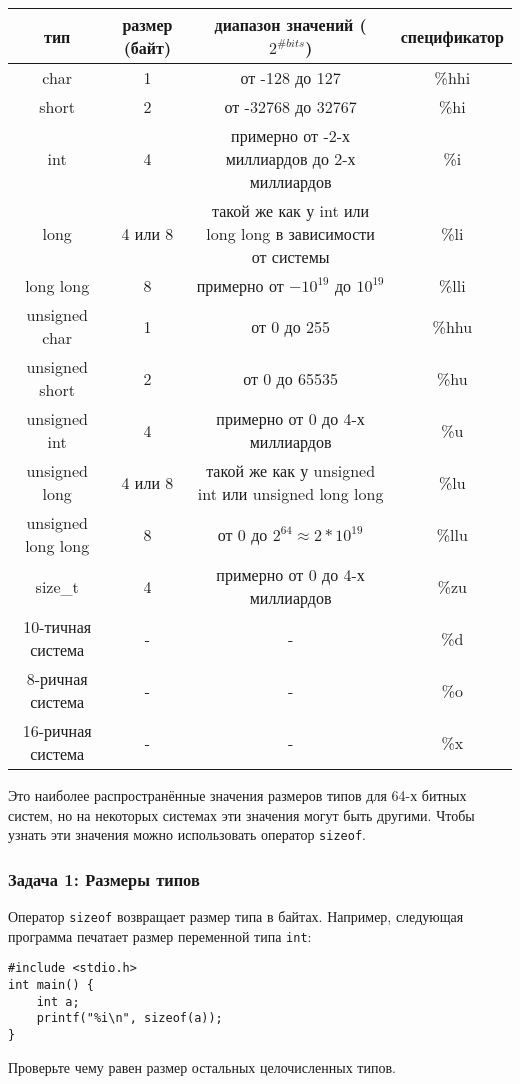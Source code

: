 \documentclass{article}
\begin{document}
\begin{center}
\begin{tabular}{ c c c c }
 тип & размер (байт) & диапазон значений ($2^{\# bits}$) & спецификатор \\ \hline
 char & 1 & от -128 до 127 & \%hhi \\ 
 short & 2 & от -32768 до 32767 & \%hi  \\  
 int & 4 & примерно от -2-х миллиардов до 2-х миллиардов & \%i  \\  
 long & 4 или 8 & такой же как у int или long long в зависимости от системы & \%li  \\  
 long long & 8 & примерно от $-10^{19}$ до $10^{19}$ & \%lli  \\  
 unsigned char & 1 & от 0 до 255 & \%hhu \\ 
 unsigned short & 2 & от 0 до 65535 & \%hu  \\  
 unsigned int & 4 & примерно от 0 до 4-х миллиардов & \%u  \\  
 unsigned long & 4 или 8 & такой же как у unsigned int или unsigned long long & \%lu  \\  
 unsigned long long & 8 & от 0 до $2^{64} \approx 2*10^{19}$  & \%llu  \\  
 size\_t & 4 & примерно от 0 до 4-х миллиардов & \%zu \\ \hline
 10-тичная система & - & - & \%d \\
 8-ричная система & - & - & \%o \\
 16-ричная система & - & - & \%x  \\ 
\end{tabular}
\end{center}
Это наиболее распространённые значения размеров типов для 64-х битных систем, но на некоторых системах эти значения могут быть другими.
Чтобы узнать эти значения можно использовать оператор \texttt{sizeof}. \\

\subsubsection*{Задача 1: Размеры типов}
Оператор \texttt{sizeof} возвращает размер типа в байтах. Например, следующая программа печатает размер переменной типа \texttt{int}:
\begin{lstlisting}
#include <stdio.h>
int main() {
    int a;
    printf("%i\n", sizeof(a));
}
\end{lstlisting}
Проверьте чему равен размер остальных целочисленных типов.
\end{document}
